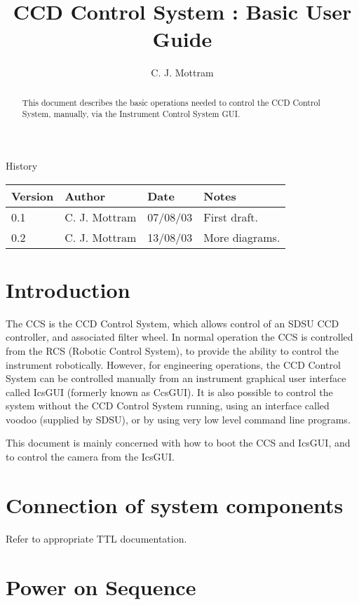 \documentclass[10pt,a4paper]{article}
\title{CCD Control System : Basic User Guide}
\author{C. J. Mottram}
\date{}
\begin{document}
\thispagestyle{empty}
\maketitle
\begin{abstract}
This document describes the basic operations needed to control the CCD Control System, manually,
via the Instrument Control System GUI.
\end{abstract}

\centerline{\Large History}
\begin{center}
\begin{tabular}{|l|l|l|p{15em}|}
\hline
{\bf Version} & {\bf Author} & {\bf Date} & {\bf Notes} \\
\hline
0.1 & C. J. Mottram & 07/08/03 & First draft. \\
0.2 & C. J. Mottram & 13/08/03 & More diagrams. \\
\hline
\end{tabular}
\end{center}

\newpage
\tableofcontents
\listoffigures
\listoftables
\newpage

\section{Introduction}
The CCS is the CCD Control System, which allows control of an SDSU CCD controller, and associated filter wheel.
In normal operation the CCS is controlled from the RCS (Robotic Control System), to provide the ability
to control the instrument robotically. However, for engineering operations, the CCD Control System can be controlled
manually from an instrument graphical user interface called IcsGUI (formerly known as CcsGUI). It is also possible
to control the system without the CCD Control System running, using an interface called voodoo (supplied by SDSU),
or by using very low level command line programs.

This document is mainly concerned with how to boot the CCS and IcsGUI, and to control the camera from the IcsGUI.

\section{Connection of system components}
Refer to appropriate TTL documentation.

\section{Power on Sequence}
\end{document}
